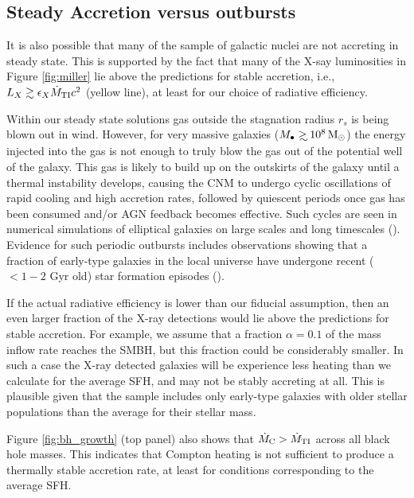 \documentclass[usenatbib,fleqn]{mn2e}
\newcommand\gsim{\mathrel{\rlap{\lower4pt\hbox{\hskip1pt$\sim$}}
    \raise1pt\hbox{$>$}}}
\newcommand{\rs}{r_s}
\newcommand{\Mbh}[1][]{M_{\bullet#1}}
\begin{document}
\subsection{Steady Accretion versus outbursts}
\label{sec:cycle}

It is also possible that many of the \citet{Miller+15} sample of
galactic nuclei are not accreting in steady state.  This is supported by the fact that many of the X-say luminosities in Figure \ref{fig:miller} lie above the predictions for stable accretion, i.e., $L_X \gtrsim \epsilon_X \dot{M}_{\rm TI}c^{2}$ (yellow line), at least for our choice of radiative efficiency.  

Within our steady state solutions gas outside the stagnation radius
$\rs$ is being blown out in wind. However, for very massive galaxies
($\Mbh\gsim 10^8 \Msun$) the energy injected into the gas is not
enough to truly blow the gas out of the potential well of the
galaxy. This gas is likely to build up on the outskirts of the galaxy
until a thermal instability develops, causing the CNM to undergo
cyclic oscillations of rapid cooling and high accretion rates,
followed by quiescent periods once gas has been consumed and/or AGN
feedback becomes effective. Such cycles are seen in numerical
simulations of elliptical galaxies on large scales and long timescales
(\citealt{Ciotti+10}).  Evidence for such periodic outbursts includes
observations showing that a fraction of early-type galaxies in the
local universe have undergone recent ($< 1-2$ Gyr old) star formation
episodes (\citealt{Donas+07}).

If the actual radiative efficiency is lower than our fiducial
assumption, then an even larger fraction of the X-ray detections would
lie above the predictions for stable accretion.  For example, we
assume that a fraction $\alpha = 0.1$ of the mass inflow rate reaches
the SMBH, but this fraction could be considerably smaller. In such a
case the X-ray detected galaxies will be experience less heating than
we calculate for the average SFH, and may not be stably accreting at
all.  This is plausible given that the \citet{Miller+15} sample
includes only early-type galaxies with older stellar populations than
the average for their stellar mass.

Figure \ref{fig:bh_growth} (top panel) also shows that $\dot{M}_{\rm
  C} > \dot{M}_{\rm TI}$ across all black hole masses.  This indicates
that Compton heating is not sufficient to produce a thermally stable
accretion rate, at least for conditions corresponding to the average
SFH.
\end{document}
